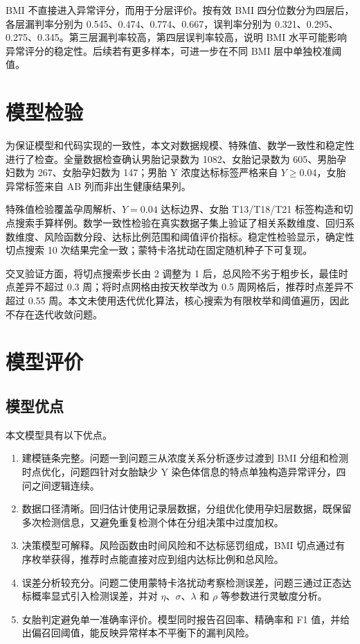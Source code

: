 \documentclass[UTF8,zihao=-4]{ctexart}
\numberwithin{equation}{section}
\begin{document}
BMI 不直接进入异常评分，而用于分层评价。按有效 BMI 四分位数分为四层后，各层漏判率分别为 0.545、0.474、0.774、0.667，误判率分别为 0.321、0.295、0.275、0.345。第三层漏判率较高，第四层误判率较高，说明 BMI 水平可能影响异常评分的稳定性。后续若有更多样本，可进一步在不同 BMI 层中单独校准阈值。

\section{模型检验}

为保证模型和代码实现的一致性，本文对数据规模、特殊值、数学一致性和稳定性进行了检查。全量数据检查确认男胎记录数为 1082、女胎记录数为 605、男胎孕妇数为 267、女胎孕妇数为 147；男胎 Y 浓度达标标签严格来自 $Y\ge0.04$，女胎异常标签来自 AB 列而非出生健康结果列。

特殊值检验覆盖孕周解析、$Y=0.04$ 达标边界、女胎 T13/T18/T21 标签构造和切点搜索手算样例。数学一致性检验在真实数据子集上验证了相关系数维度、回归系数维度、风险函数分段、达标比例范围和阈值评价指标。稳定性检验显示，确定性切点搜索 10 次结果完全一致；蒙特卡洛扰动在固定随机种子下可复现。

交叉验证方面，将切点搜索步长由 2 调整为 1 后，总风险不劣于粗步长，最佳时点差异不超过 0.3 周；将时点网格由按天枚举改为 0.5 周网格后，推荐时点差异不超过 0.55 周。本文未使用迭代优化算法，核心搜索为有限枚举和阈值遍历，因此不存在迭代收敛问题。

\section{模型评价}

\subsection{模型优点}

本文模型具有以下优点。
\begin{enumerate}
  \item 建模链条完整。问题一到问题三从浓度关系分析逐步过渡到 BMI 分组和检测时点优化，问题四针对女胎缺少 Y 染色体信息的特点单独构造异常评分，四问之间逻辑连续。
  \item 数据口径清晰。回归估计使用记录层数据，分组优化使用孕妇层数据，既保留多次检测信息，又避免重复检测个体在分组决策中过度加权。
  \item 决策模型可解释。风险函数由时间风险和不达标惩罚组成，BMI 切点通过有序枚举获得，推荐时点能直接对应到组内达标比例和总风险。
  \item 误差分析较充分。问题二使用蒙特卡洛扰动考察检测误差，问题三通过正态达标概率显式引入检测误差，并对 $\eta$、$\sigma$、$\lambda$ 和 $\rho$ 等参数进行灵敏度分析。
  \item 女胎判定避免单一准确率评价。模型同时报告召回率、精确率和 F1 值，并给出偏召回阈值，能反映异常样本不平衡下的漏判风险。
\end{enumerate}
\end{document}

